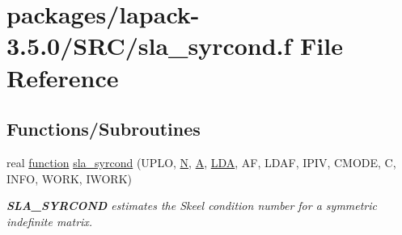 \hypertarget{sla__syrcond_8f}{}\section{packages/lapack-\/3.5.0/\+S\+R\+C/sla\+\_\+syrcond.f File Reference}
\label{sla__syrcond_8f}
\subsection*{Functions/\+Subroutines}
\begin{DoxyCompactItemize}
\item 
real \hyperlink{afunc_8m_a7b5e596df91eadea6c537c0825e894a7}{function} \hyperlink{group__realSYcomputational_ga2d103aec11d1fe30e887c40f6173da32}{sla\+\_\+syrcond} (U\+P\+L\+O, \hyperlink{polmisc_8c_a0240ac851181b84ac374872dc5434ee4}{N}, \hyperlink{classA}{A}, \hyperlink{example__user_8c_ae946da542ce0db94dced19b2ecefd1aa}{L\+D\+A}, A\+F, L\+D\+A\+F, I\+P\+I\+V, C\+M\+O\+D\+E, C, I\+N\+F\+O, W\+O\+R\+K, I\+W\+O\+R\+K)
\begin{DoxyCompactList}\small\item\em {\bfseries S\+L\+A\+\_\+\+S\+Y\+R\+C\+O\+N\+D} estimates the Skeel condition number for a symmetric indefinite matrix. \end{DoxyCompactList}\end{DoxyCompactItemize}
